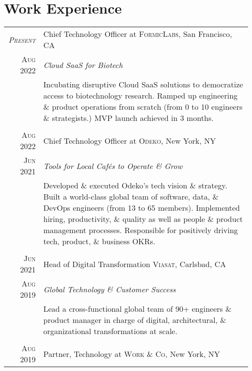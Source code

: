 \documentclass[a4paper,10pt]{article}
\begin{document}
\section{Work Experience}
\begin{tabular}{r|p{14cm}}
  \textsc{\emph{Present}} & Chief Technology Officer at \textsc{FormicLabs}, San Francisco, CA \\

  \textsc{Aug 2022} & \emph{Cloud SaaS for Biotech}\\

  &\footnotesize{Incubating disruptive Cloud SaaS solutions to
    democratize access to biotechnology research. Ramped up
    engineering \& product operations from scratch (from 0 to 10
    engineers \& strategists.) MVP launch achieved in 3 months.}\\

  \multicolumn{2}{c}{}\\
  \textsc{Aug 2022} & Chief Technology Officer at \textsc{Odeko}, New York, NY \\

  \textsc{Jun 2021} & \emph{Tools for Local Caf\'{e}s to Operate \& Grow}\\

  &\footnotesize{Developed \& executed Odeko's tech vision \&
    strategy. Built a world-class global team of software, data, \&
    DevOps engineers (from 13 to 65 members). Implemented hiring,
    productivity, \& quality as well as people \& product management
    processes. Responsible for positively driving tech, product, \&
    business OKRs.}\\

  \multicolumn{2}{c}{}\\

  \textsc{Jun 2021} & Head of Digital Transformation \textsc{Viasat}, Carlsbad, CA \\

  \textsc{Aug 2019} & \emph{Global Technology \& Customer Success}\\

  &\footnotesize{Lead a cross-functional global team of 90+ engineers
    \& product manager in charge of digital, architectural, \&
    organizational transformations at scale.}\\

  \multicolumn{2}{c}{}\\

  \textsc{Aug 2019} & Partner, Technology at \textsc{Work \& Co}, New York, NY \\


\end{tabular}
\end{document}
